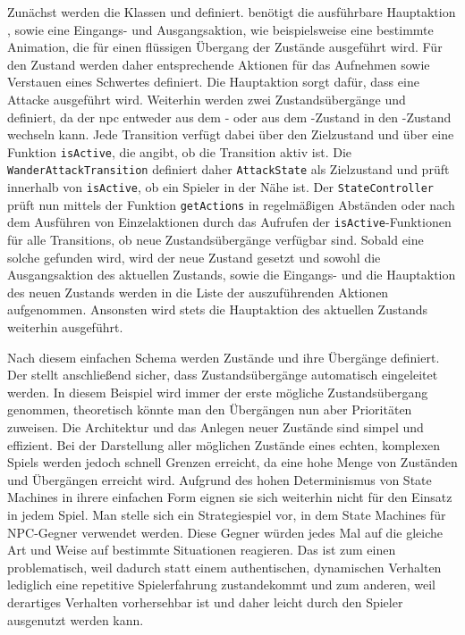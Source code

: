 Zunächst werden die Klassen  und  definiert.  benötigt die ausführbare Hauptaktion , sowie eine Eingangs- und Ausgangsaktion, wie beispielsweise eine bestimmte Animation, die für einen flüssigen Übergang der Zustände ausgeführt wird. Für den Zustand  werden daher entsprechende Aktionen für das Aufnehmen sowie Verstauen eines Schwertes definiert. Die Hauptaktion  sorgt dafür, dass eine Attacke ausgeführt wird. Weiterhin werden zwei Zustandsübergänge  und  definiert, da der \ac{npc} entweder aus dem - oder aus dem -Zustand in den -Zustand wechseln kann.
Jede Transition verfügt dabei über den Zielzustand und über eine Funktion \texttt{isActive}, die angibt, ob die Transition aktiv ist. Die \texttt{WanderAttackTransition} definiert daher \texttt{AttackState} als Zielzustand und prüft innerhalb von \texttt{isActive}, ob ein Spieler in der Nähe ist.
Der \texttt{StateController} prüft nun mittels der Funktion \texttt{getActions} in regelmäßigen Abständen oder nach dem Ausführen von Einzelaktionen durch das Aufrufen der \texttt{isActive}-Funktionen für alle Transitions, ob neue Zustandsübergänge verfügbar sind. Sobald eine solche gefunden wird, wird der neue Zustand gesetzt und sowohl die Ausgangsaktion des aktuellen Zustands, sowie die Eingangs- und die Hauptaktion des neuen Zustands werden in die Liste der auszuführenden Aktionen aufgenommen. Ansonsten wird stets die Hauptaktion des aktuellen Zustands weiterhin ausgeführt.

Nach diesem einfachen Schema werden Zustände und ihre Übergänge definiert. Der  stellt anschließend sicher, dass Zustandsübergänge automatisch eingeleitet werden. In diesem Beispiel wird immer der erste mögliche Zustandsübergang genommen, theoretisch könnte man den Übergängen nun aber Prioritäten zuweisen. Die Architektur und das Anlegen neuer Zustände sind simpel und effizient. Bei der Darstellung aller möglichen Zustände eines echten, komplexen Spiels werden jedoch schnell Grenzen erreicht, da eine hohe Menge von Zuständen und Übergängen erreicht wird. Aufgrund des hohen Determinismus von State Machines in ihrere einfachen Form eignen sie sich weiterhin nicht für den Einsatz in jedem Spiel. Man stelle sich ein Strategiespiel vor, in dem State Machines für NPC-Gegner verwendet werden. Diese Gegner würden jedes Mal auf die gleiche Art und Weise auf bestimmte Situationen reagieren. Das ist zum einen problematisch, weil dadurch statt einem authentischen, dynamischen Verhalten lediglich eine repetitive Spielerfahrung zustandekommt und zum anderen, weil derartiges Verhalten vorhersehbar ist und daher leicht durch den Spieler ausgenutzt werden kann.


